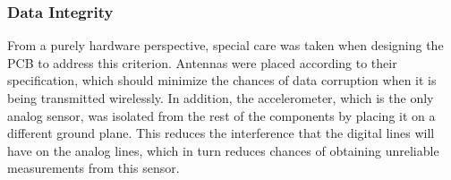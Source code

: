 \subsubsection{Data Integrity}
From a purely hardware perspective, special care was taken when designing the PCB to address this criterion.  Antennas were placed according to their specification, which should minimize the chances of data corruption when it is being transmitted wirelessly.  In addition, the accelerometer, which is the only analog sensor, was isolated from the rest of the components by placing it on a different ground plane.  This reduces the interference that the digital lines will have on the analog lines, which in turn reduces chances of obtaining unreliable measurements from this sensor.
